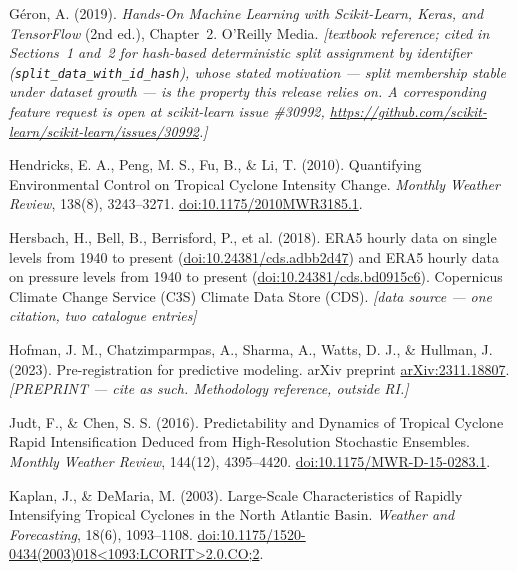 \documentclass[11pt]{article}
\begin{document}
\begin{references}
\item G\'eron, A. (2019). \emph{Hands-On Machine Learning with Scikit-Learn,
Keras, and TensorFlow} (2nd ed.), Chapter~2. O'Reilly Media.
\emph{[textbook reference; cited in Sections~1 and~2 for hash-based
deterministic split assignment by identifier
(\texttt{split\_data\_with\_id\_hash}), whose stated motivation --- split
membership stable under dataset growth --- is the property this release relies
on. A corresponding feature request is open at scikit-learn issue \#30992,
\url{https://github.com/scikit-learn/scikit-learn/issues/30992}.]}

\item Hendricks, E. A., Peng, M. S., Fu, B., \& Li, T. (2010). Quantifying
Environmental Control on Tropical Cyclone Intensity Change. \emph{Monthly
Weather Review}, 138(8), 3243--3271.
\href{https://doi.org/10.1175/2010MWR3185.1}{doi:10.1175/2010MWR3185.1}.

\item Hersbach, H., Bell, B., Berrisford, P., et al. (2018). ERA5 hourly data
on single levels from 1940 to present
(\href{https://doi.org/10.24381/cds.adbb2d47}{doi:10.24381/cds.adbb2d47}) and
ERA5 hourly data on pressure levels from 1940 to present
(\href{https://doi.org/10.24381/cds.bd0915c6}{doi:10.24381/cds.bd0915c6}).
Copernicus Climate Change Service (C3S) Climate Data Store (CDS).
\emph{[data source --- one citation, two catalogue entries]}

\item Hofman, J. M., Chatzimparmpas, A., Sharma, A., Watts, D. J., \&
Hullman, J. (2023). Pre-registration for predictive modeling. arXiv preprint
\href{https://arxiv.org/abs/2311.18807}{arXiv:2311.18807}.
\emph{[PREPRINT --- cite as such. Methodology reference, outside RI.]}

\item Judt, F., \& Chen, S. S. (2016). Predictability and Dynamics of Tropical
Cyclone Rapid Intensification Deduced from High-Resolution Stochastic
Ensembles. \emph{Monthly Weather Review}, 144(12), 4395--4420.
\href{https://doi.org/10.1175/MWR-D-15-0283.1}{doi:10.1175/MWR-D-15-0283.1}.

\item Kaplan, J., \& DeMaria, M. (2003). Large-Scale Characteristics of
Rapidly Intensifying Tropical Cyclones in the North Atlantic Basin.
\emph{Weather and Forecasting}, 18(6), 1093--1108.
\href{https://doi.org/10.1175/1520-0434(2003)018\%3C1093:LCORIT\%3E2.0.CO;2}%
{doi:10.1175/1520-0434(2003)018<1093:LCORIT>2.0.CO;2}.


\end{references}
\end{document}
